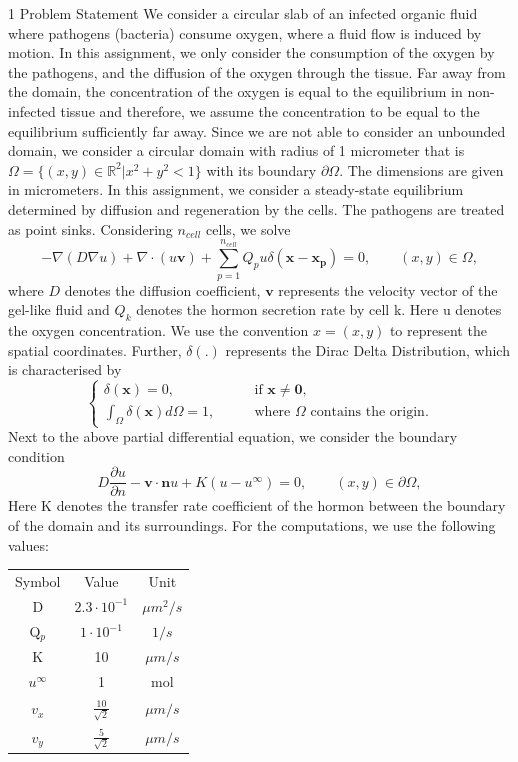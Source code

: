 \documentclass[a4paper,10pt]{report}
\title{}
\author{}
\begin{document}
1 Problem Statement
We consider a circular slab of an infected organic fluid where pathogens (bacteria)
consume oxygen, where a fluid flow is induced by motion. In this assignment,
we only consider the consumption of the oxygen by the pathogens,
and the diffusion of the oxygen through the tissue. Far away from the domain,
the concentration of the oxygen is equal to the equilibrium in non-infected
tissue and therefore, we assume the concentration to be equal to the equilibrium
sufficiently far away. Since we are not able to consider an unbounded
domain, we consider a circular domain with radius of 1 micrometer that is
$\Omega=\{(x,y)\in \mathbb{R}^2|x^2+y^2<1\}$ with its boundary $\partial \Omega$. The dimensions are given
in micrometers. In this assignment, we consider a steady-state equilibrium determined
by diffusion and regeneration by the cells. The pathogens are treated
as point sinks. Considering $n_{cell}$ cells, we solve
\begin{equation}\label{eq:1}
 -\nabla (D\nabla{u})+\nabla \cdot (u\mathbf{v}) +\sum_{p=1}^{n_{cell}}Q_pu\delta(\mathbf{x-\mathbf{x}_p})= 0, \qquad (x,y) \in \Omega, 
 \end{equation}
where $D$ denotes the diffusion coefficient, $\mathbf{v}$ represents the velocity vector of the
gel-like fluid and $Q_k$ denotes the hormon secretion rate by cell k. Here u denotes
the oxygen concentration. We use the convention $x = (x, y)$ to represent the
spatial coordinates. Further, $\delta(.)$ represents the Dirac Delta Distribution, which
is characterised by
\begin{equation*}
\begin{cases}
    \delta(\mathbf{x})=0, &\qquad \text{if } \mathbf{x} \neq \mathbf{0},\\
     \int_{\Omega }\delta (\mathbf{x}) d \Omega =1, &\qquad \text{where }\Omega \text{ contains the origin.}
    \end{cases}
\end{equation*}
Next to the above partial differential equation, we consider the boundary condition
\begin{equation}
 D\frac{\partial u}{\partial n}- \mathbf{v}\cdot \mathbf{n}u+ K(u-u^{\infty})=0,   \qquad (x,y) \in \partial \Omega, 
 \end{equation}
Here K denotes the transfer rate coefficient of the hormon between the boundary
of the domain and its surroundings. For the computations, we use the following
values:
\begin{table}
\begin{tabular}{ |c|c|c|} 

Symbol &Value& Unit\\
D &$2.3 \cdot 10^{−1}$& $\mu m^2/s$\\
Q$_p$& $1 \cdot 10^{−1}$& $1/s$\\
K &10 &$\mu m/s$\\
$u^{\infty}$& 1 &mol\\
$v_x$& $\frac{10}{\sqrt{2}}$&$\mu m/s$\\
$v_y$& $\frac{5}{\sqrt{2}}$&$\mu m/s$\\
\end{tabular}
\end{table}
\end{document}
